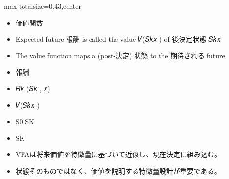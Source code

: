\clearpage
{}
\begin{minipage}[t]{0.405\textwidth}
\begin{adjustbox}{max totalsize={\textwidth}{0.43\textheight},center}
\begin{minipage}{\textwidth}\scriptsize
{}\begin{itemize}
\item 価値関数
\item Expected future 報酬 is called the value 𝑉(𝑆𝑘𝑥 ) of 後決定状態 𝑆𝑘𝑥
\item The value function maps a (post-決定) 状態 to the 期待される future
\item 報酬
\item 𝑅𝑘 (𝑆𝑘 , 𝑥)
\item 𝑉(𝑆𝑘𝑥 )
\item S0 SK
\item SK
\end{itemize}\begin{itemize}
\item VFAは将来価値を特徴量に基づいて近似し、現在決定に組み込む。
\item 状態そのものではなく、価値を説明する特徴量設計が重要である。
\end{itemize}
\end{minipage}
\end{adjustbox}
\end{minipage}\hfill
